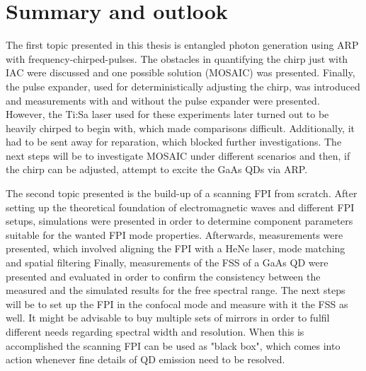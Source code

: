 \chapter{Summary and outlook}
The first topic presented in this thesis is entangled photon generation using \ac{ARP} with frequency-chirped-pulses.
The obstacles in quantifying the chirp just with \ac{IAC} were discussed and one possible solution (\ac{MOSAIC}) was presented.
Finally, the pulse expander, used for deterministically adjusting the chirp, was introduced and measurements with and without the pulse expander were presented.
However, the Ti:Sa laser used for these experiments later turned out to be heavily chirped to begin with, which made comparisons difficult.
Additionally, it had to be sent away for reparation, which blocked further investigations.
The next steps will be to investigate \ac{MOSAIC} under different scenarios and then, if the chirp can be adjusted, attempt to excite the GaAs \acp{QD} via \ac{ARP}.

The second topic presented is the build-up of a scanning \ac{FPI} from scratch.
After setting up the theoretical foundation of electromagnetic waves and different \ac{FPI} setups, simulations were presented in order to determine component parameters suitable for the wanted \ac{FPI} mode properties.
Afterwards, measurements were presented, which involved aligning the \ac{FPI} with a HeNe laser, mode matching and spatial filtering
Finally, measurements of the \ac{FSS} of a GaAs \ac{QD} were presented and evaluated in order to confirm the consistency between the measured and the simulated results for the free spectral range.
The next steps will be to set up the \ac{FPI} in the confocal mode and measure with it the \ac{FSS} as well.
It might be advisable to buy multiple sets of mirrors in order to fulfil different needs regarding spectral width and resolution.
When this is accomplished the scanning \ac{FPI} can be used as "black box", which comes into action whenever fine details of \ac{QD} emission need to be resolved.